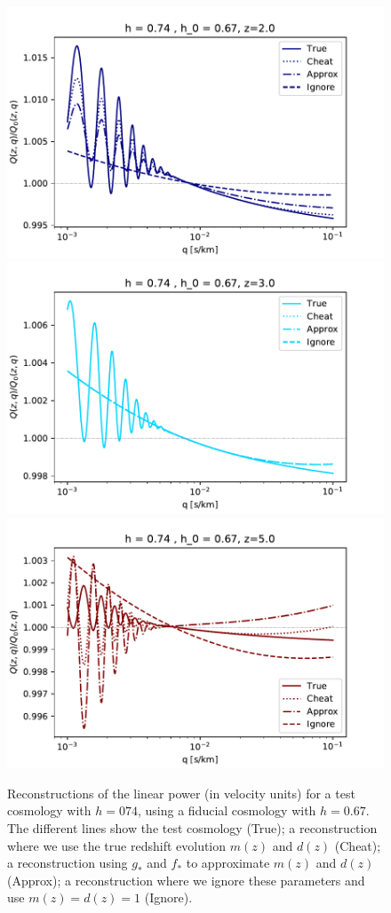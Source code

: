 \begin{figure}[ht]
 \begin{center}
  \includegraphics[scale=0.7]{Figures/recP_h074_0}
  \includegraphics[scale=0.7]{Figures/recP_h074_1}
  \includegraphics[scale=0.7]{Figures/recP_h074_2}
 \end{center}
 \caption{Reconstructions of the linear power (in velocity units) for a test
  cosmology with $h=074$, using a fiducial cosmology with $h=0.67$.
  The different lines show the test cosmology (True); a reconstruction where
  we use the true redshift evolution $m(z)$ and $d(z)$ (Cheat); a
  reconstruction using $g_\ast$ and $f_\ast$ to approximate $m(z)$ and $d(z)$
  (Approx); a reconstruction where we ignore these parameters and use
  $m(z) = d(z) = 1$ (Ignore).}
 \label{fig:recP}
\end{figure}
